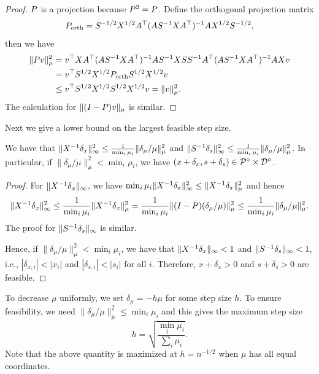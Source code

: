 \begin{proof}
$P$ is a projection because $P^{2}=P$. Define the
orthogonal projection matrix
\[
P_{\mathrm{orth}}=S^{-1/2}X^{1/2}A^{\top}(AS^{-1}XA^{\top})^{-1}AX^{1/2}S^{-1/2},
\]
then we have
\begin{align*}
\|P v\|^{2}_{\mu} & =v^{\top}XA^{\top}(AS^{-1}XA^{\top})^{-1}AS^{-1}XSS^{-1}A^{\top}(AS^{-1}XA^{\top})^{-1}AX v\\
 & =v^{\top}S^{1/2}X^{1/2}P_{\mathrm{orth}}S^{1/2}X^{1/2}v\\
 & \leq v^{\top}S^{1/2}X^{1/2}S^{1/2}X^{1/2}v=\|v\|^{2}_{\mu}.
\end{align*}
The calculation for $\|(I-P)v\|_{\mu}$ is similar.
\end{proof}
Next we give a lower bound on the largest feasible step size.
\begin{lem}
\label{lem:step_size}We have that $\|X^{-1}\delta_{x}\|^{2}_{\infty}\leq\frac{1}{\min_{i}\mu_{i}}\|\delta_{\mu}/\mu\|^{2}_{\mu}$
and $\|S^{-1}\delta_{s}\|^{2}_{\infty}\leq\frac{1}{\min_{i}\mu_{i}}\|\delta_{\mu}/\mu\|^{2}_{\mu}$.
In particular, if $\|\delta_{\mu}/\mu\|^{2}_{\mu}<\min_{i}\mu_{i}$,
we have $(x+\delta_{x},s+\delta_{s})\in\mathcal{P}^{\circ}\times\mathcal{D}^{\circ}$.
\end{lem}

\begin{proof}
For $\|X^{-1}\delta_{x}\|_{\infty}$, we have $\min_{i}\mu_{i}\|X^{-1}\delta_{x}\|^{2}_{\infty}\leq\|X^{-1}\delta_{x}\|^{2}_{\mu}$
and hence
\[
\|X^{-1}\delta_{x}\|^{2}_{\infty}\leq\frac{1}{\min_{i}\mu_{i}}\|X^{-1}\delta_{x}\|^{2}_{\mu}=\frac{1}{\min_{i}\mu_{i}}\|(I-P)(\delta_{\mu}/\mu)\|^{2}_{\mu}\leq\frac{1}{\min_{i}\mu_{i}}\|\delta_{\mu}/\mu\|^{2}_{\mu}.
\]
The proof for $\|S^{-1}\delta_{s}\|_{\infty}$ is similar.

Hence, if $\|\delta_{\mu}/\mu\|^{2}_{\mu}<\min_{i}\mu_{i}$, we have
that $\|X^{-1}\delta_{x}\|_{\infty}<1$ and $\|S^{-1}\delta_{s}\|_{\infty}<1$,
i.e., $|\delta_{x,i}|<|x_{i}|$ and $|\delta_{s,i}|<|s_{i}|$ for
all $i$. Therefore, $x+\delta_{x}>0$ and $s+\delta_{s}>0$ are feasible.
\end{proof}
To decrease $\mu$ uniformly, we set $\delta_{\mu}=-h\mu$ for some
step size $h$. To ensure feasibility, we need $\|\delta_{\mu}/\mu\|^{2}_{\mu}\leq\min_{i}\mu_{i}$
and this gives the maximum step size
\begin{equation}
h=\sqrt{\frac{\min_{i}\mu_{i}}{\sum_{i}\mu_{i}}}.\label{eq:max_h_formula}
\end{equation}
Note that the above quantity is maximized at $h=n^{-1/2}$ when $\mu$
has all equal coordinates.


